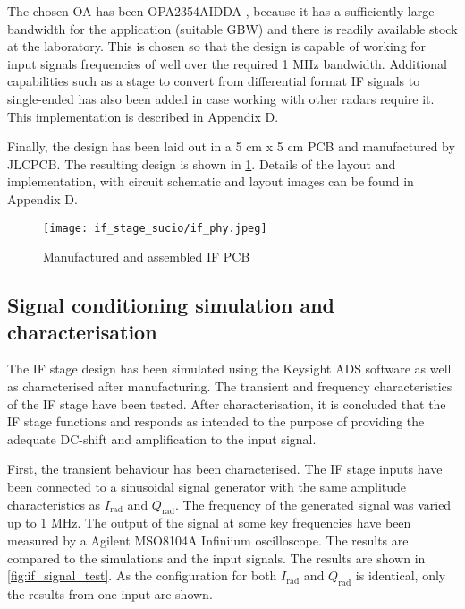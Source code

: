 The chosen OA has been OPA2354AIDDA \cite{TexasInstruments2014}, because it has a sufficiently large bandwidth for the application (suitable GBW) and there is readily available stock at the laboratory. This is chosen so that the design is capable of working for input signals frequencies of well over the required 1 MHz bandwidth. Additional capabilities such as a stage to convert from differential format IF signals to single-ended has also been added in case working with other radars require it. This implementation is described in Appendix D. %

Finally, the design has been laid out in a 5 cm x 5 cm PCB and manufactured by JLCPCB. The resulting design is shown in \cref{fig:if_phy}. Details of the layout and implementation, with circuit schematic and layout images can be found in Appendix D. %

\begin{figure}[h]
	\centering
	\texttt{[image: if\_stage\_sucio/if\_phy.jpeg]}
	\caption{Manufactured and assembled IF PCB}
	\label{fig:if_phy}
\end{figure}

\subsection{Signal conditioning simulation and characterisation}

The IF stage design has been simulated using the Keysight ADS software as well as characterised after manufacturing. The transient and frequency characteristics of the IF stage have been tested. After characterisation, it is concluded that the IF stage functions and responds as intended to the purpose of providing the adequate DC-shift and amplification to the input signal.

First, the transient behaviour has been characterised. The IF stage inputs have been connected to a sinusoidal signal generator with the same amplitude characteristics as $I_\mathrm{rad}$ and $Q_\mathrm{rad}$. The frequency of the generated signal was varied up to 1 MHz. The output of the signal at some key frequencies have been measured by a Agilent MSO8104A Infiniium oscilloscope. The results are compared to the simulations and the input signals. The results are shown in \cref{fig:if_signal_test}. As the configuration for both $I_\mathrm{rad}$ and $Q_\mathrm{rad}$ is identical, only the results from one input are shown.


